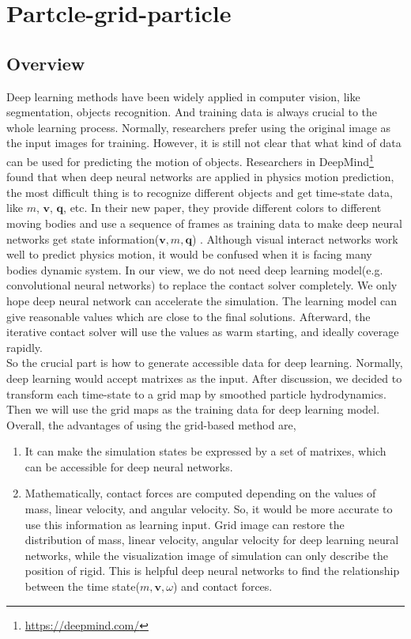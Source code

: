 \chapter{Partcle-grid-particle}
\section{Overview}
    Deep learning methods have been widely applied in computer vision, like segmentation, objects recognition. And training data is always crucial to the whole learning process. Normally, researchers prefer using the original image as the input images for training. However, it is still not clear that what kind of data can be used for predicting the motion of objects. Researchers in DeepMind\footnote{\url{https://deepmind.com/}} found that when deep neural networks are applied in physics motion prediction, the most difficult thing is to recognize different objects and get time-state data, like $m$, $\pmb{v}$, $\pmb{q}$, etc. In their new paper, they provide different colors to different moving bodies and use a sequence of frames as training data to make deep neural networks get state information($\pmb{v}, m, \pmb{q}$) \cite{DBLP:journals/corr/WattersTWPBZ17}.  Although visual interact networks work well to predict physics motion, it would be confused when it is facing many bodies dynamic system. In our view, we do not need deep learning model(e.g. convolutional neural networks) to replace the contact solver completely. We only hope deep neural network can accelerate the simulation. The learning model can give reasonable values which are close to the final solutions. Afterward, the iterative contact solver will use the values as warm starting, and ideally coverage rapidly. \\

    So the crucial part is how to generate accessible data for deep learning. Normally, deep learning would accept matrixes as the input. After discussion, we decided to transform each time-state to a grid map by smoothed particle hydrodynamics. Then we will use the grid maps as the training data for deep learning model. Overall, the advantages of using the grid-based method are,
    \begin{enumerate}
        \item It can make the simulation states be expressed by a set of matrixes, which can be accessible for deep neural networks.
        \item Mathematically, contact forces are computed depending on the values of mass, linear velocity, and angular velocity. So, it would be more accurate to use this information as learning input. Grid image can restore the distribution of mass, linear velocity, angular velocity for deep learning neural networks, while the visualization image of simulation can only describe the position of rigid. This is helpful deep neural networks to find the relationship between the time state($m, \pmb{v}, \omega$) and contact forces.
    \end{enumerate}

